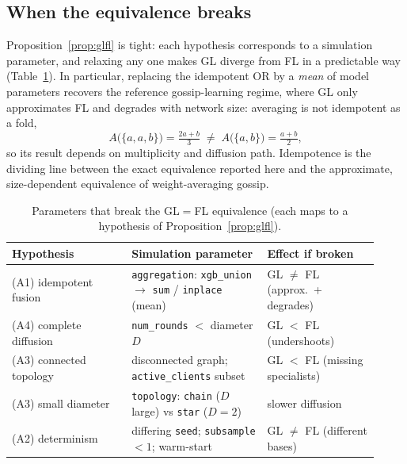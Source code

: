 \documentclass[11pt]{article}
\theoremstyle{remark}
\begin{document}
\subsection{When the equivalence breaks}

Proposition~\ref{prop:glfl} is tight: each hypothesis corresponds to a
simulation parameter, and relaxing any one makes GL diverge from FL in a
predictable way (Table~\ref{tab:glfl-break}). In particular, replacing the
idempotent OR by a \emph{mean} of model parameters recovers the reference
gossip-learning regime, where GL only approximates FL and degrades with network
size: averaging is not idempotent as a fold,
\[
  A\bigl(\{a,a,b\}\bigr)=\tfrac{2a+b}{3}\;\neq\;A\bigl(\{a,b\}\bigr)=\tfrac{a+b}{2},
\]
so its result depends on multiplicity and diffusion path. Idempotence is the
dividing line between the exact equivalence reported here and the approximate,
size-dependent equivalence of weight-averaging gossip.

\begin{table}[t]
  \centering
  \caption{Parameters that break the GL$=$FL equivalence (each maps to a
    hypothesis of Proposition~\ref{prop:glfl}).}
  \label{tab:glfl-break}
  \begin{tabular}{p{0.30\linewidth}p{0.34\linewidth}p{0.28\linewidth}}
    \toprule
    Hypothesis & Simulation parameter & Effect if broken \\
    \midrule
    (A1) idempotent fusion & \texttt{aggregation}: \texttt{xgb\_union} $\to$ \texttt{sum} / \texttt{inplace} (mean) & GL $\neq$ FL (approx.\ + degrades) \\
    (A4) complete diffusion & \texttt{num\_rounds} $<$ diameter $D$ & GL $<$ FL (undershoots) \\
    (A3) connected topology & disconnected graph; \texttt{active\_clients} subset & GL $<$ FL (missing specialists) \\
    (A3) small diameter & \texttt{topology}: \texttt{chain} ($D$ large) vs \texttt{star} ($D{=}2$) & slower diffusion \\
    (A2) determinism & differing \texttt{seed}; \texttt{subsample}${<}1$; warm-start & GL $\neq$ FL (different bases) \\
    \bottomrule
  \end{tabular}
\end{table}
\end{document}
